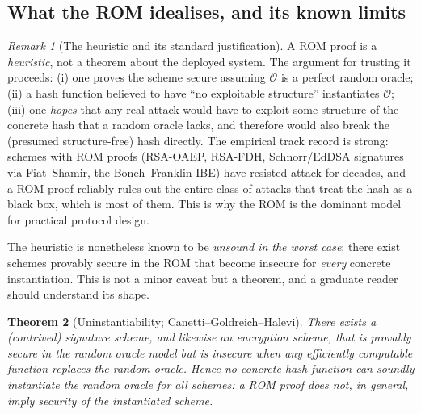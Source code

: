 \documentclass[11pt,a4paper]{article}
\newtheorem{theorem}{Theorem}[section]
\theoremstyle{definition}
\theoremstyle{remark}
\newtheorem{remark}[theorem]{Remark}
\begin{document}
\subsection{What the ROM idealises, and its known limits}\label{hash:sub:romlimits}

\begin{remark}[The heuristic and its standard justification]\label{hash:rem:romheuristic}
A ROM proof is a \emph{heuristic}, not a theorem about the deployed system. The argument for trusting it proceeds: (i) one proves the scheme secure assuming \(\mathcal{O}\) is a perfect random oracle; (ii) a hash function believed to have ``no exploitable structure'' instantiates \(\mathcal{O}\); (iii) one \emph{hopes} that any real attack would have to exploit some structure of the concrete hash that a random oracle lacks, and therefore would also break the (presumed structure-free) hash directly. The empirical track record is strong: schemes with ROM proofs (RSA-OAEP, RSA-FDH, Schnorr/EdDSA signatures via Fiat--Shamir, the Boneh--Franklin IBE) have resisted attack for decades, and a ROM proof reliably rules out the entire class of attacks that treat the hash as a black box, which is most of them. This is why the ROM is the dominant model for practical protocol design.
\end{remark}

The heuristic is nonetheless known to be \emph{unsound in the worst case}: there exist schemes provably secure in the ROM that become insecure for \emph{every} concrete instantiation. This is not a minor caveat but a theorem, and a graduate reader should understand its shape.

\begin{theorem}[Uninstantiability; Canetti--Goldreich--Halevi]\label{hash:thm:cgh}
There exists a (contrived) signature scheme, and likewise an encryption scheme, that is provably secure in the random oracle model but is insecure when \emph{any} efficiently computable function replaces the random oracle. Hence no concrete hash function can soundly instantiate the random oracle for all schemes: a ROM proof does not, in general, imply security of the instantiated scheme.
\end{theorem}
\end{document}

